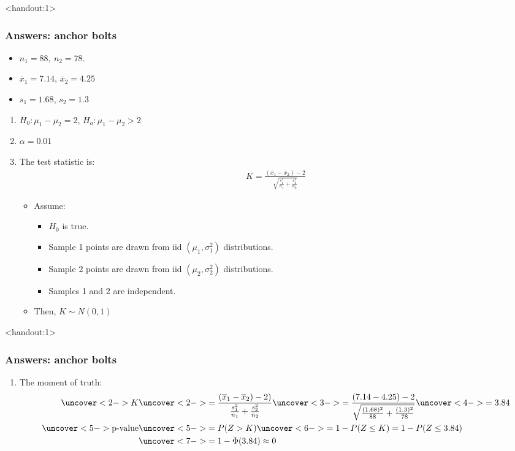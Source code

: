 \documentclass[handout]{beamer}\usepackage{graphicx, color}
\newcommand{\answers}{1}
\providecommand{\ov}[1]{\overline{#1}}
\numberwithin{equation}{section}
\begin{document}
\begin{frame}<handout:\answers>
\frametitle{Answers: anchor bolts}
\begin{itemize}
\item $n_1 = 88, \ n_2 = 78$.
\pause \item $\ov{x}_1 = 7.14$, $\ov{x}_2 = 4.25$ 
\pause \item $s_1 = 1.68$, $s_2 = 1.3$
\end{itemize}
\begin{enumerate}[1. ]
\pause \item $H_0: \mu_1 - \mu_2 = 2$, $H_a: \mu_1 - \mu_2 > 2$
\pause \item $\alpha = 0.01$
\pause \item The test statistic is:
\pause \begin{align*}
K = \frac{(\ov{x}_1 - \ov{x}_2) - 2}{\sqrt{\frac{s^2_1}{n_1} + \frac{s^2_2}{n_2}}}
\end{align*}
\begin{itemize}
\pause \item Assume:
\begin{itemize}
\pause \item $H_0$ is true.
\pause \item Sample 1 points are drawn from iid $(\mu_1, \sigma^2_1)$ distributions.
\pause \item Sample 2 points are drawn from iid $(\mu_2, \sigma^2_2)$ distributions.
\pause \item Samples 1 and 2 are independent.
\end{itemize}
\pause \item Then, $K \sim N(0,1)$
\end{itemize}
\end{enumerate}
\end{frame}

\begin{frame}<handout:\answers>
\frametitle{Answers: anchor bolts}
\begin{enumerate}[1. ]
 \setcounter{enumi}{\value{saveenum}}
\item The moment of truth:
\begin{align*}
\uncover<2->{K} &\uncover<2->{=  \frac{(\ov{x}_1 - \ov{x}_2) - 2)}{\frac{s^2_1}{n_1} + \frac{s^2_2}{n_2}}} \uncover<3->{ = \frac{(7.14 - 4.25) - 2}{\sqrt{\frac{(1.68)^2}{88} + \frac{(1.3)^2}{78} }}}\uncover<4->{ = 3.84} \\
\uncover<5->{\text{p-value}} &\uncover<5->{= P(Z > K) } \uncover<6->{= 1 - P(Z \le K) = 1 - P(Z \le 3.84)}  \\
&\uncover<7->{= 1 - \Phi(3.84) \approx 0}
\end{align*}
\end{enumerate}
\end{frame}
\end{document}
